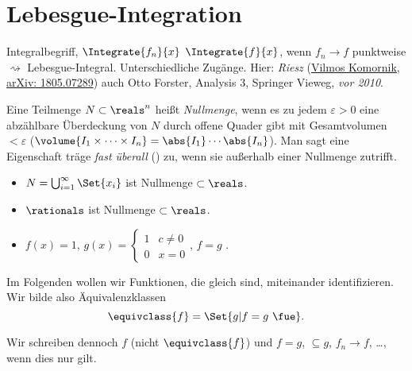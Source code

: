 \chapter{Lebesgue-Integration}
Integralbegriff, \sd \( \Integrate{f_n}{x} \) \tto \( \Integrate{f}{x} \), wenn \( f_n\to f \) punktweise \( \rightsquigarrow \) Lebesgue-Integral. Unterschiedliche Zugänge. Hier: \emph{Riesz} (\href{https://arxiv.org/abs/1805.07289}{Vilmos Komornik, arXiv: 1805.07289}) \vgl auch Otto Forster, Analysis 3, Springer Vieweg, \emph{vor 2010}.

\begin{definition}
  Eine Teilmenge \( N\subset \reals^n \) heißt \emph{Nullmenge}, wenn es zu jedem \( \varepsilon>0 \) eine abzählbare Überdeckung von \( N \) durch offene Quader gibt mit Gesamtvolumen \( <\varepsilon \) (\( \volume{I_1\times \dotsb \times I_n}=\abs{I_1}\dotsm \abs{I_n} \)). Man sagt eine Eigenschaft träge \emph{fast überall} (\fue) zu, wenn sie außerhalb einer Nullmenge zutrifft.
\end{definition}
\begin{beispiele*}
  \begin{itemize}
    \item \( N=\bigcup_{i=1}^{\infty}\Set{x_i} \) ist Nullmenge \( \subset \reals \).
    \item \( \rationals \) ist Nullmenge \( \subset \reals \).
    \item \( f(x)=1 \), \( g(x)=\begin{cases}
      1 & c\neq 0 \\ 0 & x=0
    \end{cases} \), \( f=g \) \fue.
  \end{itemize}
\end{beispiele*}
Im Folgenden wollen wir Funktionen, die \fue gleich sind, miteinander identifizieren. Wir bilde also Äquivalenzklassen
\begin{equation*}
  \equivclass{f}=\Set{g|f=g \text{ \fue}}.
\end{equation*}
\begin{notation*}
  Wir schreiben dennoch \( f \) (nicht \( \equivclass{f} \)) und \( f=g \), \( \subseteq g \), \( f_n\to f \), \dots, wenn dies nur \fue gilt.
\end{notation*}
